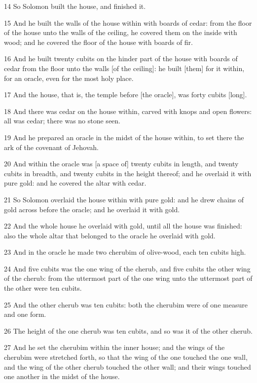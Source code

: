 \par 14 So Solomon built the house, and finished it.
\par 15 And he built the walls of the house within with boards of cedar: from the floor of the house unto the walls of the ceiling, he covered them on the inside with wood; and he covered the floor of the house with boards of fir.
\par 16 And he built twenty cubits on the hinder part of the house with boards of cedar from the floor unto the walls [of the ceiling]: he built [them] for it within, for an oracle, even for the most holy place.
\par 17 And the house, that is, the temple before [the oracle], was forty cubits [long].
\par 18 And there was cedar on the house within, carved with knops and open flowers: all was cedar; there was no stone seen.
\par 19 And he prepared an oracle in the midst of the house within, to set there the ark of the covenant of Jehovah.
\par 20 And within the oracle was [a space of] twenty cubits in length, and twenty cubits in breadth, and twenty cubits in the height thereof; and he overlaid it with pure gold: and he covered the altar with cedar.
\par 21 So Solomon overlaid the house within with pure gold: and he drew chains of gold across before the oracle; and he overlaid it with gold.
\par 22 And the whole house he overlaid with gold, until all the house was finished: also the whole altar that belonged to the oracle he overlaid with gold.
\par 23 And in the oracle he made two cherubim of olive-wood, each ten cubits high.
\par 24 And five cubits was the one wing of the cherub, and five cubits the other wing of the cherub: from the uttermost part of the one wing unto the uttermost part of the other were ten cubits.
\par 25 And the other cherub was ten cubits: both the cherubim were of one measure and one form.
\par 26 The height of the one cherub was ten cubits, and so was it of the other cherub.
\par 27 And he set the cherubim within the inner house; and the wings of the cherubim were stretched forth, so that the wing of the one touched the one wall, and the wing of the other cherub touched the other wall; and their wings touched one another in the midst of the house.
